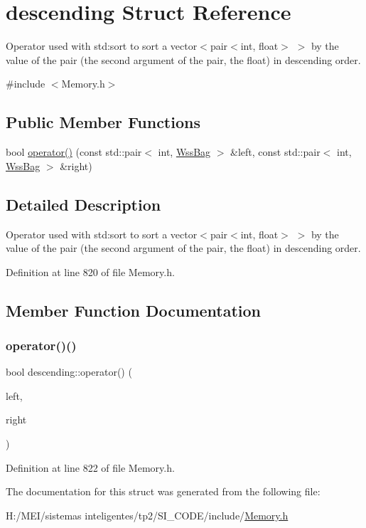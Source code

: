 \hypertarget{structdescending}{}\section{descending Struct Reference}
\label{structdescending}


Operator used with std\+:sort to sort a vector$<$pair$<$int, float$>$ $>$ by the value of the pair (the second argument of the pair, the float) in descending order.  




{\ttfamily \#include $<$Memory.\+h$>$}

\subsection*{Public Member Functions}
\begin{DoxyCompactItemize}
\item 
bool \hyperlink{structdescending_a40cf683917ac8db4a163427d9585e5af}{operator()} (const std\+::pair$<$ int, \hyperlink{class_wss_bag}{Wss\+Bag} $>$ \&left, const std\+::pair$<$ int, \hyperlink{class_wss_bag}{Wss\+Bag} $>$ \&right)
\end{DoxyCompactItemize}


\subsection{Detailed Description}
Operator used with std\+:sort to sort a vector$<$pair$<$int, float$>$ $>$ by the value of the pair (the second argument of the pair, the float) in descending order. 

Definition at line 820 of file Memory.\+h.



\subsection{Member Function Documentation}
\mbox{\label{structdescending_a40cf683917ac8db4a163427d9585e5af}} 
\subsubsection{\texorpdfstring{operator()()}{operator()()}}
{\footnotesize\ttfamily bool descending\+::operator() (\begin{DoxyParamCaption}\item[{const std\+::pair$<$ int, \hyperlink{class_wss_bag}{Wss\+Bag} $>$ \&}]{left,  }\item[{const std\+::pair$<$ int, \hyperlink{class_wss_bag}{Wss\+Bag} $>$ \&}]{right }\end{DoxyParamCaption})\hspace{0.3cm}{\ttfamily [inline]}}



Definition at line 822 of file Memory.\+h.



The documentation for this struct was generated from the following file\+:\begin{DoxyCompactItemize}
\item 
H\+:/\+M\+E\+I/sistemas inteligentes/tp2/\+S\+I\+\_\+\+C\+O\+D\+E/include/\hyperlink{_memory_8h}{Memory.\+h}\end{DoxyCompactItemize}
